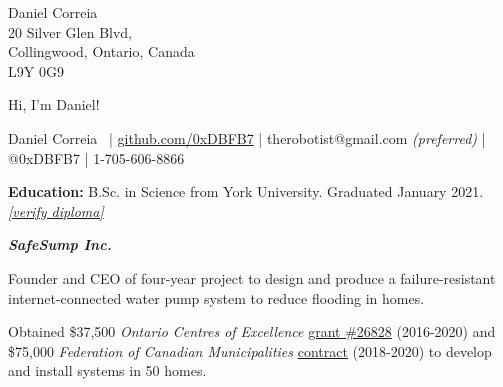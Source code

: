 \documentclass[fleqn,11pt]{article}
\newcommand{\ressection}[1]{\textbf{{\Large \textit{#1}}}\xrfill[0.1ex]{0.6pt}}
\begin{document}
Daniel Correia\\
20 Silver Glen Blvd,\\
Collingwood, Ontario, Canada\\
L9Y 0G9\\



\vspace{3 cm}
\noindent\par
\noindent{}




\restoregeometry


\clearpage








\begingroup
{}\selectfont

{\Huge Hi, I'm Daniel!}

\endgroup


\begin{center}
\small{{Daniel Correia}\  | \href{https://github.com/0xDBFB7}{github.com/0xDBFB7} | therobotist@gmail.com \textit{(preferred)} | @0xDBFB7 | 1-705-606-8866}\\
\light{\makebox[\linewidth]{\rule{\textwidth}{0.4pt}}}
\end{center}


\begin{tcolorbox}
\textbf{Education:} B.Sc. in Science from York University. Graduated January 2021. \href{https://learner.mycreds.ca/#/sharelink/b664abe7-53a7-4d64-a0f1-bef16337edd0/57724eeb-34ab-4b79-b2a6-cd6bc311039e}{\textit{[verify diploma]}}
\end{tcolorbox}


\ressection{SafeSump Inc.}

Founder and CEO of four-year project to design and produce a failure-resistant internet-connected water pump system to reduce flooding in homes.

Obtained \$37,500 \textit{Ontario Centres of Excellence} \href{https://drive.google.com/file/d/1WXrxVwTggaL7WEvLv6DgJ891fSo7LqqP/view?usp=sharing}{grant \#26828} (2016-2020) and \$75,000 \textit{Federation of Canadian Municipalities} \href{https://drive.google.com/file/d/11pdJNzYDE-28X3m0rH8mE4cxoliTJZGH/view?usp=sharing}{contract} (2018-2020) to develop and install systems in 50 homes.
\end{document}
